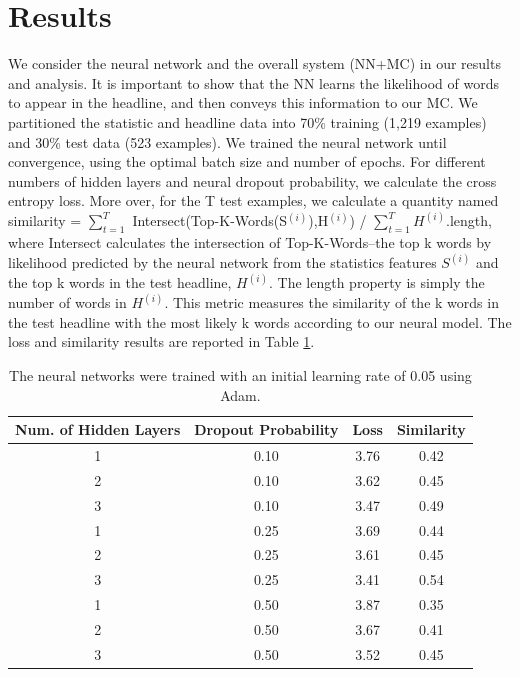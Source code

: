 \documentclass[12pt, journal]{IEEEtran}
\begin{document}
\section{Results}
We consider the neural network and the overall system (NN+MC) in our results and analysis. It is important to show that the NN learns the likelihood of words to appear in the headline, and then conveys this information to our MC. We partitioned the statistic and headline data into 70\% training (1,219 examples) and 30\% test data (523 examples). We trained the neural network until convergence, using the optimal batch size and number of epochs. For different numbers of hidden layers and neural dropout probability, we calculate the cross entropy loss. More over, for the T test examples, we calculate a quantity named similarity = $\sum_{t=1}^{T}$ Intersect(Top-K-Words(S$^{(i)}$),H$^{(i)}$) / $\sum_{t=1}^{T} H^{(i)}$.length, where Intersect calculates the intersection of Top-K-Words--the top k words by likelihood predicted by the neural network from the statistics features $S^{(i)}$ and the top k words in the test headline, $H^{(i)}$. The length property is simply the number of words in $H^{(i)}$. This metric measures the similarity of the k words in the test headline with the most likely k words according to our neural model. The loss and similarity results are reported in Table \ref{table_example}. 

\begin{table}[!t]
\renewcommand{\arraystretch}{1.3}
\caption{The neural networks were trained with an initial learning rate of 0.05 using Adam.}
\label{table_example}
\centering
\begin{tabular}{|c||c||c||c|}
\hline
Num. of Hidden Layers & Dropout Probability & Loss & Similarity \\
\hline
1 & 0.10 & 3.76 & 0.42\\
2 & 0.10 & 3.62 & 0.45\\
3 & 0.10 & 3.47 & 0.49\\
1 & 0.25 & 3.69 & 0.44\\
2 & 0.25 & 3.61 & 0.45\\
3 & 0.25 & 3.41 & 0.54\\
1 & 0.50 & 3.87 & 0.35\\
2 & 0.50 & 3.67 & 0.41\\
3 & 0.50 & 3.52 & 0.45\\
\hline
\end{tabular}
\end{table}
\end{document}
